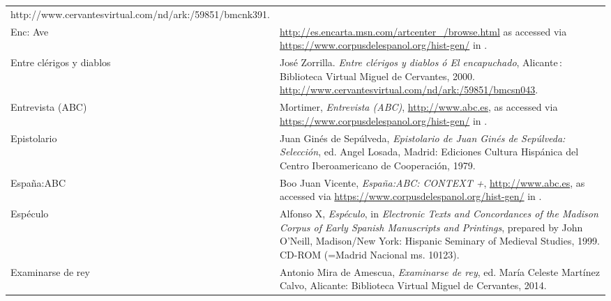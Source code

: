 \documentclass[output=paper]{langscibook}
\begin{document}
\begin{tabularx}{\textwidth}{XX}
http://www.cervantesvirtual.com/nd/ark:/59851/bmcnk391.\\
Enc: Ave  & \url{http://es.encarta.msn.com/artcenter_/browse.html} as accessed via \url{https://www.corpusdelespanol.org/hist-gen/} in \citealt{May2021}.\\
Entre clérigos y diablos & José Zorrilla. \textit{Entre clérigos y diablos ó El encapuchado}, Alicante : Biblioteca Virtual Miguel de Cervantes, 2000. \url{http://www.cervantesvirtual.com/nd/ark:/59851/bmcsn043}.\\
Entrevista (ABC) & Mortimer, \textit{Entrevista (ABC)}, \url{http://www.abc.es}, as accessed via \url{https://www.corpusdelespanol.org/hist-gen/} in \citealt{May2021}.\\
Epistolario & Juan Ginés de Sepúlveda, \textit{Epistolario de Juan Ginés de Sepúlveda: Selección}, ed. Angel Losada, Madrid: Ediciones Cultura Hispánica del Centro Iberoamericano de Cooperación, 1979.\\
España:ABC & Boo Juan Vicente, \textit{España:ABC: CONTEXT +}, \url{http://www.abc.es}, as accessed via \url{https://www.corpusdelespanol.org/hist-gen/} in \citealt{May2021}.\\
Espéculo & Alfonso X, \textit{Espéculo}, in \textit{Electronic Texts and Concordances of the Madison Corpus of Early Spanish Manuscripts and Printings}, prepared by John O’Neill, Madison/New York: Hispanic Seminary of Medieval Studies, 1999. CD-ROM (=Madrid Nacional ms. 10123).\\
Examinarse de rey & Antonio Mira de Amescua, \textit{Examinarse de rey}, ed. María Celeste Martínez Calvo, Alicante: Biblioteca Virtual Miguel de Cervantes, 2014. 


\end{tabularx}
\end{document}
